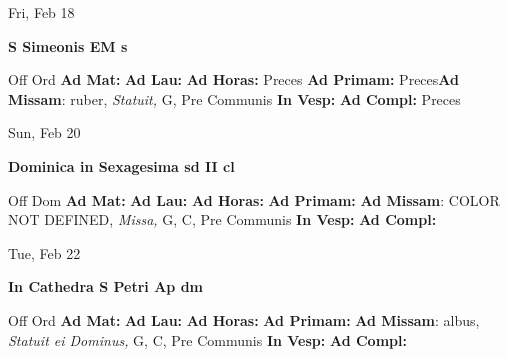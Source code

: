 \documentclass[10pt]{memoir}
\begin{document}
\begin{center}
\begin{minipage}{3.5in}
\vspace{2em}
\begin{center}Fri, Feb 18
\end{center}
\textbf{ \large S Simeonis EM
\textnormal{\normalsize s}}

\begin{justify}Off Ord
\textbf{Ad Mat: }
\textbf{Ad Lau: }
\textbf{Ad Horas: }Preces
\textbf{Ad Primam: }Preces\textbf{Ad Missam}: ruber, \textit{Statuit,} G, Pre Communis
\textbf{In Vesp: }
\textbf{Ad Compl: }Preces
\end{justify}
\end{minipage}
\end{center}

\begin{center}
\begin{minipage}{3.5in}
\vspace{2em}
\begin{center}Sun, Feb 20
\end{center}
\textbf{ \large Dominica in Sexagesima
\textnormal{\normalsize sd II cl}}

\begin{justify}Off Dom
\textbf{Ad Mat: }
\textbf{Ad Lau: }
\textbf{Ad Horas: }
\textbf{Ad Primam: }\textbf{Ad Missam}: COLOR NOT DEFINED, \textit{Missa,} G, C, Pre Communis
\textbf{In Vesp: }
\textbf{Ad Compl: }
\end{justify}
\end{minipage}
\end{center}

\begin{center}
\begin{minipage}{3.5in}
\vspace{2em}
\begin{center}Tue, Feb 22
\end{center}
\textbf{ \large In Cathedra S Petri Ap
\textnormal{\normalsize dm}}

\begin{justify}Off Ord
\textbf{Ad Mat: }
\textbf{Ad Lau: }
\textbf{Ad Horas: }
\textbf{Ad Primam: }\textbf{Ad Missam}: albus, \textit{Statuit ei Dominus,} G, C, Pre Communis
\textbf{In Vesp: }
\textbf{Ad Compl: }
\end{justify}
\end{minipage}
\end{center}
\end{document}
